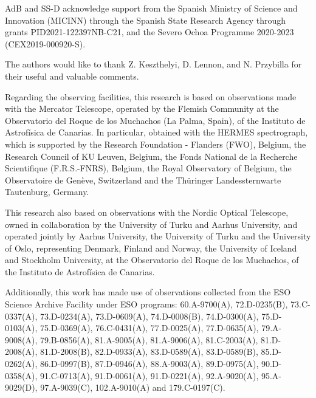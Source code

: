 \documentclass{aa}
\begin{document}
\begin{acknowledgements}

AdB and SS-D acknowledge support from the Spanish Ministry of Science and Innovation (MICINN) through the Spanish State Research Agency through grants PID2021-122397NB-C21, and the Severo Ochoa Programme 2020-2023 (CEX2019-000920-S).

The authors would like to thank Z. Keszthelyi, D. Lennon, and N. Przybilla for their useful and valuable comments.

Regarding the observing facilities, this research is based on observations made with the Mercator Telescope, operated by the Flemish Community at the Observatorio del Roque de los Muchachos (La Palma, Spain), of the Instituto de Astrof\'isica de Canarias. In particular, obtained with the HERMES spectrograph, which is supported by the Research Foundation - Flanders (FWO), Belgium, the Research Council of KU Leuven, Belgium, the Fonds National de la Recherche Scientifique (F.R.S.-FNRS), Belgium, the Royal Observatory of Belgium, the Observatoire de Genève, Switzerland and the Thüringer Landessternwarte Tautenburg, Germany.

This research also based on observations with the Nordic Optical Telescope, owned in collaboration by the University of Turku and Aarhus University, and operated jointly by Aarhus University, the University of Turku and the University of Oslo, representing Denmark, Finland and Norway, the University of Iceland and Stockholm University, at the Observatorio del Roque de los Muchachos, of the Instituto de Astrof\'isica de Canarias.

Additionally, this work has made use of observations collected from the ESO Science Archive Facility under ESO programs: 60.A-9700(A), 72.D-0235(B), 73.C-0337(A), 73.D-0234(A), 73.D-0609(A), 74.D-0008(B), 74.D-0300(A), 75.D-0103(A), 75.D-0369(A), 76.C-0431(A), 77.D-0025(A), 77.D-0635(A), 79.A-9008(A), 79.B-0856(A), 81.A-9005(A), 81.A-9006(A), 81.C-2003(A), 81.D-2008(A), 81.D-2008(B), 82.D-0933(A), 83.D-0589(A), 83.D-0589(B), 85.D-0262(A), 86.D-0997(B), 87.D-0946(A), 88.A-9003(A), 89.D-0975(A), 90.D-0358(A), 91.C-0713(A), 91.D-0061(A), 91.D-0221(A), 92.A-9020(A), 95.A-9029(D), 97.A-9039(C), 102.A-9010(A) and 179.C-0197(C).

\end{acknowledgements}



\typeout{}
\end{document}
